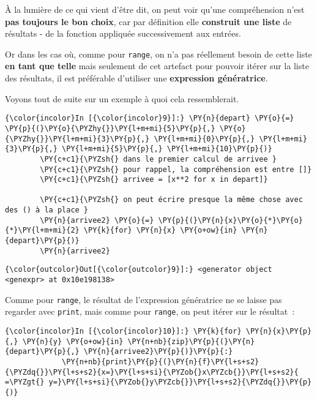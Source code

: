     À la lumière de ce qui vient d'être dit, on peut voir qu'une
compréhension n'est \textbf{pas toujours le bon choix}, car par
définition elle \textbf{construit une liste} de résultats - de la
fonction appliquée successivement aux entrées.

Or dans les cas où, comme pour \texttt{range}, on n'a pas réellement
besoin de cette liste \textbf{en tant que telle} mais seulement de cet
artefact pour pouvoir itérer sur la liste des résultats, il est
préférable d'utiliser une \textbf{expression génératrice}.

Voyons tout de suite sur un exemple à quoi cela ressemblerait.

    \begin{Verbatim}[commandchars=\\\{\},frame=single,framerule=0.3mm,rulecolor=\color{cellframecolor}]
{\color{incolor}In [{\color{incolor}9}]:} \PY{n}{depart} \PY{o}{=} \PY{p}{(}\PY{o}{\PYZhy{}}\PY{l+m+mi}{5}\PY{p}{,} \PY{o}{\PYZhy{}}\PY{l+m+mi}{3}\PY{p}{,} \PY{l+m+mi}{0}\PY{p}{,} \PY{l+m+mi}{3}\PY{p}{,} \PY{l+m+mi}{5}\PY{p}{,} \PY{l+m+mi}{10}\PY{p}{)}
        \PY{c+c1}{\PYZsh{} dans le premier calcul de arrivee }
        \PY{c+c1}{\PYZsh{} pour rappel, la compréhension est entre []}
        \PY{c+c1}{\PYZsh{} arrivee = [x**2 for x in depart]}
        
        \PY{c+c1}{\PYZsh{} on peut écrire presque la même chose avec des () à la place }
        \PY{n}{arrivee2} \PY{o}{=} \PY{p}{(}\PY{n}{x}\PY{o}{*}\PY{o}{*}\PY{l+m+mi}{2} \PY{k}{for} \PY{n}{x} \PY{o+ow}{in} \PY{n}{depart}\PY{p}{)}
        \PY{n}{arrivee2}
\end{Verbatim}


\begin{Verbatim}[commandchars=\\\{\},frame=single,framerule=0.3mm,rulecolor=\color{cellframecolor}]
{\color{outcolor}Out[{\color{outcolor}9}]:} <generator object <genexpr> at 0x10e198138>
\end{Verbatim}
            
    Comme pour \texttt{range}, le résultat de l'expression génératrice ne se
laisse pas regarder avec \texttt{print}, mais comme pour \texttt{range},
on peut itérer sur le résultat~:

    \begin{Verbatim}[commandchars=\\\{\},frame=single,framerule=0.3mm,rulecolor=\color{cellframecolor}]
{\color{incolor}In [{\color{incolor}10}]:} \PY{k}{for} \PY{n}{x}\PY{p}{,} \PY{n}{y} \PY{o+ow}{in} \PY{n+nb}{zip}\PY{p}{(}\PY{n}{depart}\PY{p}{,} \PY{n}{arrivee2}\PY{p}{)}\PY{p}{:}
             \PY{n+nb}{print}\PY{p}{(}\PY{n}{f}\PY{l+s+s2}{\PYZdq{}}\PY{l+s+s2}{x=}\PY{l+s+si}{\PYZob{}x\PYZcb{}}\PY{l+s+s2}{ =\PYZgt{} y=}\PY{l+s+si}{\PYZob{}y\PYZcb{}}\PY{l+s+s2}{\PYZdq{}}\PY{p}{)}
\end{Verbatim}


